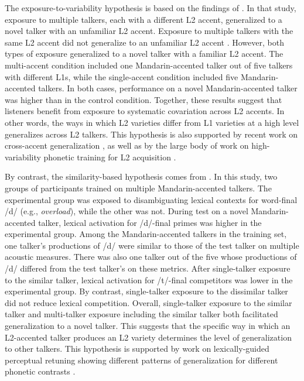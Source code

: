 \documentclass[preprint, 3p, authoryear]{elsarticle} %
\begin{document}
The exposure-to-variability hypothesis is based on the findings of \citet{baese2013}.
In that study, exposure to multiple talkers, each with a different L2 accent, generalized to a novel talker with an unfamiliar L2 accent.
Exposure to multiple talkers with the same L2 accent did not generalize to an unfamiliar L2 accent \citep{bradlow2008}.
However, both types of exposure generalized to a novel talker with a familiar L2 accent.
The multi-accent condition included one Mandarin-accented talker out of five talkers with different L1s, while the single-accent condition included five Mandarin-accented talkers.
In both cases, performance on a novel Mandarin-accented talker was higher than in the control condition.
Together, these results suggest that listeners benefit from exposure to systematic covariation across L2 accents.
In other words, the ways in which L2 varieties differ from L1 varieties at a high level generalizes across L2 talkers.
This hypothesis is also supported by recent work on cross-accent generalization \citep{bradlow2023}, as well as by the large body of work on high-variability phonetic training for L2 acquisition \citep[for a review, see][]{zhang2021hvpt}.

By contrast, the similarity-based hypothesis comes from \citet{xie2017similarity}.
In this study, two groups of participants trained on multiple Mandarin-accented talkers.
The experimental group was exposed to disambiguating lexical contexts for word-final /d/ (e.g., \emph{overload}), while the other was not.
During test on a novel Mandarin-accented talker, lexical activation for /d/-final primes was higher in the experimental group.
Among the Mandarin-accented talkers in the training set, one talker's productions of /d/ were similar to those of the test talker on multiple acoustic measures.
There was also one talker out of the five whose productions of /d/ differed from the test talker's on these metrics.
After single-talker exposure to the similar talker, lexical activation for /t/-final competitors was lower in the experimental group.
By contrast, single-talker exposure to the dissimilar talker did not reduce lexical competition.
Overall, single-talker exposure to the similar talker and multi-talker exposure including the similar talker both facilitated generalization to a novel talker.
This suggests that the specific way in which an L2-accented talker produces an L2 variety determines the level of generalization to other talkers.
This hypothesis is supported by work on lexically-guided perceptual retuning showing different patterns of generalization for different phonetic contrasts \citep{kraljic2006, kraljic2007, reinisch2014}.
\end{document}

